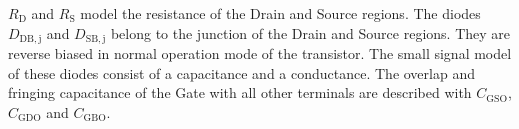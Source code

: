 \documentclass{article}[11pt]
\begin{document}
$R_{\mathrm{D}}$ and $R_{\mathrm{S}}$ model the resistance of the Drain and 
Source regions. 
The diodes $D_{\mathrm{DB,j}}$ and $D_{\mathrm{SB,j}}$ belong to the junction 
of the Drain and Source regions.
They are reverse biased in normal operation mode of the transistor. 
The small signal model of these diodes consist of a capacitance and 
a conductance.
The overlap and fringing capacitance of the Gate with all other terminals are 
described with $C_{\mathrm{GSO}}$, $C_{\mathrm{GDO}}$ and $C_{\mathrm{GBO}}$.

\cite{bsim480-man}
\cite{ngspice-44}
\cite{tsividis-mosfetmodel-11}

\printbibliography
\end{document}
